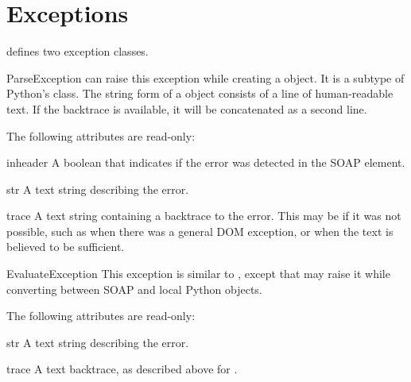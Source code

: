 \chapter{Exceptions}

\ZSI{} defines two exception classes.

\begin{excdesc}{ParseException}
\ZSI{} can raise this exception while creating a  object.
It is a subtype of Python's  class.
The string form of a  object consists of a
line of human-readable text.
If the backtrace is available, it will be concatenated as a second line.
\end{excdesc}

The following attributes are read-only:

\begin{memberdesc}{inheader}
A boolean that indicates if the error was detected in the SOAP 
element.
\end{memberdesc}

\begin{memberdesc}{str}
A text string describing the error.
\end{memberdesc}

\begin{memberdesc}{trace}
A text string containing a backtrace to the error.
This may be  if it was not possible, such as when there was
a general DOM exception, or when the  text is believed to be
sufficient.
\end{memberdesc}

\begin{excdesc}{EvaluateException}
This exception is similar to , except
that \ZSI{} may raise it while converting between SOAP and local
Python objects.
\end{excdesc}

The following attributes are read-only:

\begin{memberdesc}{str}
A text string describing the error.
\end{memberdesc}

\begin{memberdesc}{trace}
A text backtrace, as described above for .
\end{memberdesc}


